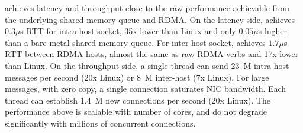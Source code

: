 \sys{} achieves latency and throughput close to the raw performance achievable from the underlying shared memory queue and RDMA.
On the latency side, \sys{} achieves $0.3\mu$s RTT for intra-host socket, 35x lower than Linux and only $0.05\mu$s higher than a bare-metal shared memory queue. For inter-host socket, \sys{} achieves $1.7\mu$s RTT between RDMA hosts, almost the same as raw RDMA verbs and 17x lower than Linux.
On the throughput side, a single thread can send 23~M intra-host messages per second (20x Linux) or 8~M inter-host (7x Linux). For large messages, with zero copy, a single connection saturates NIC bandwidth. Each thread can establish 1.4~M new connections per second (20x Linux). The performance above is scalable with number of cores, and do not degrade significantly with millions of concurrent connections.



\iffalse
This paper makes the following contributions:
\begin{ecompact}
	\item A Linux compatible, secure and high performance user-space socket system that supports both inter-process, inter-container and inter-host communication.
	\item A per-host monitor daemon for trusted control plane and peer-to-peer queues for scalable data plane.
	\item A multi-sender and multi-receiver lockless queue to fully support fork and multi-thread socket sharing.
	\item A memory efficient message queue that multiplexes multiple sockets and allows fetching from any socket, while using shared memory and RDMA transports efficiently.
\end{ecompact}
\fi